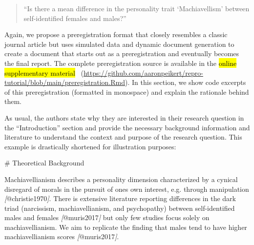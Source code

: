 \documentclass[psych,tutorial,accept,moreauthors,pdftex]{Definitions/mdpi}
\newenvironment{Shaded}{\begin{snugshade}}{\end{snugshade}}
\newcommand{\CommentTok}[1]{\textcolor[rgb]{0.56,0.35,0.01}{\textit{#1}}}
\newcommand{\FunctionTok}[1]{\textcolor[rgb]{0.00,0.00,0.00}{#1}}
\newcommand{\NormalTok}[1]{#1}
\newcommand{\OtherTok}[1]{\textcolor[rgb]{0.56,0.35,0.01}{#1}}
\begin{document}
\begin{paracol}{2}
\begin{quote}
``Is there a mean difference in the personality trait `Machiavellism'
between self-identified females and males?''
\end{quote}

Again, we propose a preregistration format that closely resembles a
classic journal article but uses simulated data and dynamic document
generation to create a document that starts out as a preregistration and
eventually becomes the final report. The complete preregistration source
is available in the \hl{online supplementary material}%
~(\url{https://github.com/aaronpeikert/repro-tutorial/blob/main/preregistration.Rmd}). In this section, we show code excerpts of this
preregistration (formatted in monospace) and explain the rationale
behind them.

As usual, the authors state why they are interested in their research
question in the ``Introduction'' section and provide the necessary
background information and literature to understand the context and
purpose of the research question. This example is drastically shortened
for illustration purposes:

\vspace{+6pt}
\end{paracol}
\nointerlineskip
\begin{adjustwidth}{0.5cm}{0cm} 
\begin{Shaded}
\begin{Highlighting}[]
\FunctionTok{\# Theoretical Background}

\NormalTok{Machiavellianism describes a personality dimension characterized by a}
\NormalTok{cynical disregard of morals in the pursuit of one\textquotesingle{}s own interest, e.g.}
\NormalTok{through manipulation }\CommentTok{[}\OtherTok{@christie1970}\CommentTok{]}\NormalTok{. There is extensive literature reporting}
\NormalTok{differences in the dark triad (narcissism, machiavellianism, and psychopathy)}
\NormalTok{between self{-}identified males and females }\CommentTok{[}\OtherTok{@muris2017}\CommentTok{]}\NormalTok{ but only few studies}
\NormalTok{focus solely on machiavellianism. We aim to replicate the finding that males}
\NormalTok{tend to have higher machiavellianism scores }\CommentTok{[}\OtherTok{@muris2017}\CommentTok{]}\NormalTok{.}
\end{Highlighting}
\end{Shaded}
\end{adjustwidth}
\end{document}
